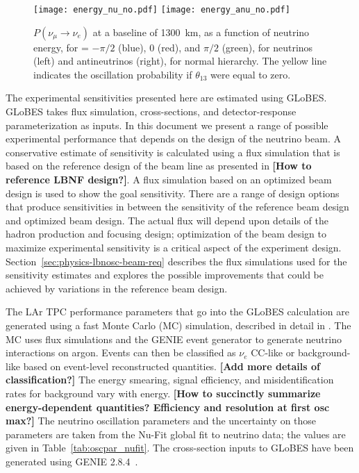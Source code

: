 \begin{figure}[!htbp]
\centering
\texttt{[image: energy\_nu\_no.pdf]}
\texttt{[image: energy\_anu\_no.pdf]}
\caption{$P(\nu_\mu \rightarrow \nu_e)$ at a baseline of 1300~km,
  as a function of neutrino energy, for \deltacp = $-\pi/2$ (blue), 
  0 (red), and $\pi/2$ (green), for neutrinos (left) and antineutrinos
  (right), for normal hierarchy. The yellow line indicates the oscillation
  probability if $\theta_{13}$ were equal to zero.}
\label{fig:oscprob}
\end{figure}

The experimental sensitivities presented here are estimated using 
GLoBES\cite{globes1,globes2}. GLoBES takes flux simulation, cross-sections,
and detector-response parameterization as inputs. In this document we present
a range of possible experimental performance that depends on the design of the neutrino beam.
A conservative estimate of sensitivity is calculated using a flux simulation that is based on the reference design of the beam line as presented in {\bf [How to reference LBNF design?]}.  A flux simulation based on an optimized beam design is used to show the goal sensitivity.  There are a range of design options that produce sensitivities in between the sensitivity of the reference beam design and optimized beam design. The actual flux will depend upon details of the hadron production and focusing design; optimization of the beam design to maximize experimental sensitivity is a critical aspect of the experiment
design.  Section~\ref{sec:physics-lbnosc-beam-req} describes the flux simulations used for the sensitivity estimates and explores the possible improvements that could be achieved by variations in the reference beam design.


The LAr TPC performance parameters that go into the GLoBES calculation are generated using a fast Monte Carlo (MC) simulation, described in detail in \cite{lbne_sciencebook}.  The MC uses flux simulations and the GENIE event generator \cite{Andreopoulos:2009rq} to generate neutrino interactions on argon.  Events can then be classified as $\nu_e$ CC-like or background-like based on event-level reconstructed quantities.   {\bf [Add more details of classification?]}
The energy smearing, signal efficiency, and misidentification rates for background vary with energy. {\bf [How to succinctly summarize energy-dependent quantities? Efficiency and resolution at first osc max?]} The neutrino oscillation
parameters and the uncertainty on those parameters are taken from the 
Nu-Fit\cite{Gonzalez-Garcia:2014bfa} global fit to neutrino data; the values are given in 
Table~\ref{tab:oscpar_nufit}.  The cross-section inputs to GLoBES have been generated using GENIE 2.8.4~\cite{Andreopoulos:2009rq}.

